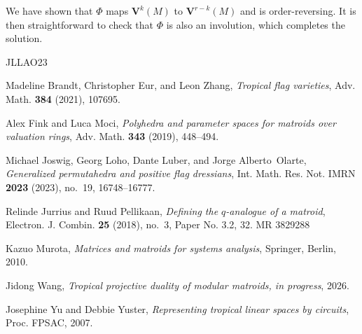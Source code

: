 \documentclass{article}
\theoremstyle{definition}
\newcommand{\bV}{\mathbf V}
\begin{document}
We have shown that $\Phi$ maps $\bV^k(M)$ to $\bV^{r-k}(M)$ and is order-reversing. It is then straightforward to check that $\Phi$ is also an involution, which completes the solution.


\providecommand{\bysame}{\leavevmode\hbox to3em{\hrulefill}\thinspace}
\providecommand{\MR}{\relax\ifhmode\unskip\space\fi MR }

\providecommand{\MRhref}[2]{%
  \href{http://www.ams.org/mathscinet-getitem?mr=#1}{#2}
}
\providecommand{\href}[2]{#2}
\begin{thebibliography}{JLLAO23}

Madeline Brandt, Christopher Eur, and Leon Zhang, \emph{Tropical flag
  varieties}, Adv. Math. \textbf{384} (2021), 107695.

Alex Fink and Luca Moci, \emph{Polyhedra and parameter spaces for matroids over
  valuation rings}, Adv. Math. \textbf{343} (2019), 448--494.

Michael Joswig, Georg Loho, Dante Luber, and Jorge Alberto~Olarte,
  \emph{Generalized permutahedra and positive flag dressians}, Int. Math. Res.
  Not. IMRN \textbf{2023} (2023), no.~19, 16748--16777.

Relinde Jurrius and Ruud Pellikaan, \emph{Defining the {$q$}-analogue of a
  matroid}, Electron. J. Combin. \textbf{25} (2018), no.~3, Paper No. 3.2, 32.
  \MR{3829288}

Kazuo Murota, \emph{Matrices and matroids for systems analysis}, Springer,
  Berlin, 2010.

Jidong Wang, \emph{Tropical projective duality of modular matroids, in
  progress}, 2026.

Josephine Yu and Debbie Yuster, \emph{Representing tropical linear spaces by
  circuits}, Proc. FPSAC, 2007.

\end{thebibliography}
\end{document}
